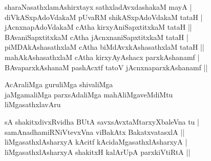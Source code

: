 \begin{entry}
\begin{shl}
sharaNasathxlamAshirxtayx sathxladAvxdashakaM mayA |\\
diVkASxpAdoVdakaM pUvaRM shikASxpAdoVdakaM tataH |\\
jAcnxnapAdoVdakaM cAtha kirxyAniSapxtitxkaM tataH ||\\
BAvaniSapxtitxkaM cAtha jAcnxnaniSapxtitxkaM tataH |\\
piMDAkAshasathxlaM cAtha biMdAvxkAshasathxlaM tataH ||\\
mahAkAshasathxlaM cAtha kirxyAyAshacx parxkAshanamf |\\
BAvaparxkAshanaM pashAcxtf tatoV jAcnxnaparxkAshanamf ||
\end{shl}
\end{entry}

\begin{entry}
\gl{}
\begin{shl}
AcAraliMga guruliMga shivaliMga\\
jaMgamaliMga parxsAdaliMga mahAliMgaveMdiMtu\\
liMgasathxlavAru
\end{shl}
\end{entry}

\begin{entry}
\begin{shl}
sA shakitxdivxRvidha BUtA savxsAvxtaMtarxyXbaleVna tu |\\
samAnadhamiRNiVtevxVna viBakAtx BakatxvatasxlA ||\\
liMgasathxlAsharxyA kAcitf kAcidaMgasathxlAsharxyA |\\
liMgasathxlAsharxyA shakitxH kalArUpA parxkiVtiRtA ||
\end{shl}
\end{entry}

